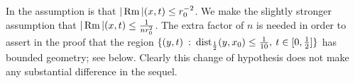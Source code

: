 \begin{remark}
  \label{rem:kl-no-local-collapsing-propagates-forward-time-larger-scales-estimates-no-local-collapsing-propagates-forward-time-larger-scales}
 \label{8.2fix}
In \cite[Theorem I.8.2]{Perelman} the assumption is that
$|\operatorname{Rm}|(x,t) \le r_0^{-2}$.
We make the slightly stronger assumption
that $|\operatorname{Rm}|(x,t) \le \frac{1}{n r_0^2}$.
The extra factor of $n$
is needed in order to assert in the proof that the region
$\{(y, t) \: : \:
\operatorname{dist}_{\frac12}(y,x_0)
\le \frac{1}{10}, \: t \in [0, \frac12 ]\}$ has
bounded geometry; see below.  Clearly this change of
hypothesis does not make any substantial difference in the
sequel.
\end{remark}

